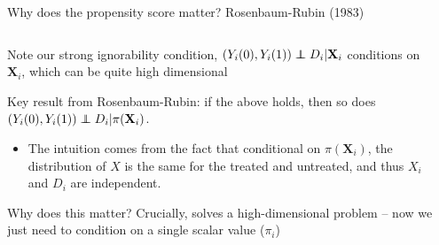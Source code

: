\documentclass[notes,11pt, aspectratio=169]{beamer}
\newcommand\independent{\protect\mathpalette{\protect\independenT}{\perp}}
\def\independenT#1#2{\mathrel{\rlap{$#1#2$}\mkern2mu{#1#2}}}
\newenvironment{wideitemize}{\itemize\addtolength{\itemsep}{10pt}}{\enditemize}
\begin{document}
\begin{frame}{Why does the propensity score matter? Rosenbaum-Rubin (1983)}
\begin{columns}[T] %
\begin{column}{.75\textwidth}
  \begin{wideitemize}
  \item Note our strong ignorability condition,
    $(Y_{i}(0), Y_{i}(1)) \independent D_{i} | \mathbf{X}_{i}$
    conditions on $\mathbf{X}_{i}$, which can be quite high
    dimensional
  \item Key result from Rosenbaum-Rubin: if the above holds, then so does
    $(Y_{i}(0), Y_{i}(1)) \independent D_{i} | \pi(\mathbf{X}_{i})$.
    \begin{itemize}
    \item The intuition comes from the fact that conditional on $\pi(\mathbf{X}_{i})$, the distribution of $X$ is the same for the treated and untreated, and thus $X_{i}$ and $D_{i}$ are independent.
    \end{itemize}
  \item Why does this matter? Crucially, solves a high-dimensional
    problem -- now we just need to condition on a single scalar value
    ($\pi_{i}$)
    \end{wideitemize}
\end{column}%
\hfill%
\begin{column}{.4\textwidth}

\end{column}%
\end{columns}
\end{frame}
\end{document}
